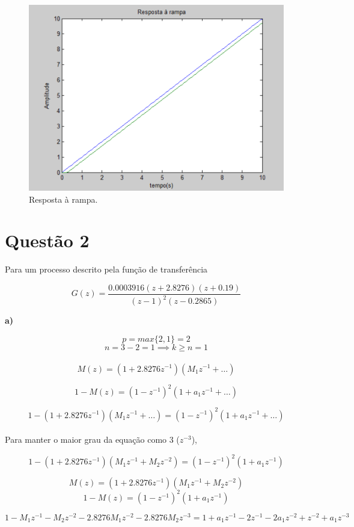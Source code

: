 \documentclass{article}
\begin{document}
    \begin{figure}[H]
       \centering
            \includegraphics[width=.7\linewidth]{images/grafico1d.png}
            \caption{Resposta à rampa.}
            \label{fig:graph1d}
    \end{figure}

    \vspace{5mm}


\section*{Questão 2}
    {Para um processo descrito pela função de transferência}

    $$ G(z) = \frac{ 0.0003916(z+2.8276)(z+0.19) }{ (z-1)^2 (z-0.2865) } $$

    {\textbf{a)}}

    $$ p = max\{ 2,1 \} = 2 $$
    $$ n = 3-2 = 1 \implies k \geq n = 1 $$\\[0.1cm]

    $$ M(z) = (1+2.8276z^{-1})(M_1 z^{-1} + \dots) $$

    $$ 1-M(z) = (1-z^{-1})^2 (1+ a_1 z^{-1} + \dots) $$

    $$ 1- (1+2.8276z^{-1})(M_1 z^{-1} + \dots) = (1-z^{-1})^2 (1+ a_1 z^{-1} + \dots) $$\\[0.1cm]

    {Para manter o maior grau da equação como 3 ($z^{-3}$),}

    $$ 1- (1+2.8276z^{-1})(M_1 z^{-1} + M_2 z^{-2}) = (1-z^{-1})^2 (1+ a_1 z^{-1}) $$

    $$ M(z) = (1+2.8276z^{-1})(M_1 z^{-1} + M_2 z^{-2}) $$
    $$ 1-M(z) = (1-z^{-1})^2 (1+ a_1 z^{-1}) $$

    $$ 1 - M_1 z^{-1}  - M_2 z^{-2} - 2.8276M_1 z^{-2} - 2.8276M_2 z^{-3} = 1 + a_1 z^{-1} - 2z^{-1} -2a_1 z^{-2} + z^{-2} +a_1 z^{-3} $$
\end{document}
